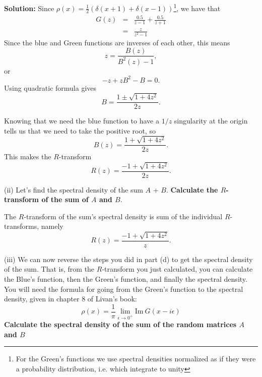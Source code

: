 \documentclass[a4paper]{article}
\begin{document}
\begin{enumerate}[label=(\alph*)]
\begin{tcolorbox}
\textbf{Solution:}
Since $\rho(x) = \frac{1}{2}(\delta(x+1) + \delta(x-1))$\footnote{For the Green's functions we use spectral densities normalized as if they were a probability distribution, i.e. which integrate to unity}, we have that 
\begin{eqnarray}
G(z) &=& \frac{0.5}{z-1} + \frac{0.5}{z+1} \\
&=& \frac{z}{z^2 - 1}
\end{eqnarray}
Since the blue and Green functions are inverses of each other, this means 
\begin{equation}
    z = \frac{B(z)}{B^2(z)-1},
\end{equation}
or
\begin{equation}
    -z + zB^2 - B = 0.
\end{equation}
Using quadratic formula gives
\begin{equation}
    B = \frac{1 \pm \sqrt{1 + 4 z^2}}{2z}.
\end{equation}

Knowing that we need the blue function to have a $1/z$ singularity at the origin tells us that we need to take the positive root, so 
\begin{equation}
    B(z) = \frac{1 + \sqrt{1 + 4 z^2}}{2z}.
\end{equation}
This makes the $R$-transform 
\begin{equation}
    R(z) = \frac{-1 + \sqrt{1 + 4 z^2}}{2z}.
\end{equation}

\end{tcolorbox}    

(ii) Let's find the spectral density of the sum $A$ + $B$. \textbf{Calculate the $R$-transform of the sum of $A$ and $B$}.
\begin{tcolorbox}
The $R$-transform of the sum's spectral density is sum of the individual $R$-transforms, namely 
\begin{equation}
    R(z) = \frac{-1 + \sqrt{1 + 4 z^2}}{z}.
\end{equation}

\end{tcolorbox}

(iii) We can now reverse the steps you did in part (d) to get the spectral density of the sum.  That is, from the $R$-transform you just calculated, you can calculate the Blue's function, then the Green's function, and finally the spectral density.  You will need the formula for going from the Green's function to the spectral density, given in chapter 8 of Livan's book:
\begin{equation}
\rho(x) = \frac{1}{\pi}\lim_{\epsilon\rightarrow 0^+} \mathrm{Im}~ G(x-i\epsilon)
\end{equation}
\textbf{Calculate the spectral density of the sum of the random matrices $A$ and $B$}


\end{enumerate}
\end{document}
